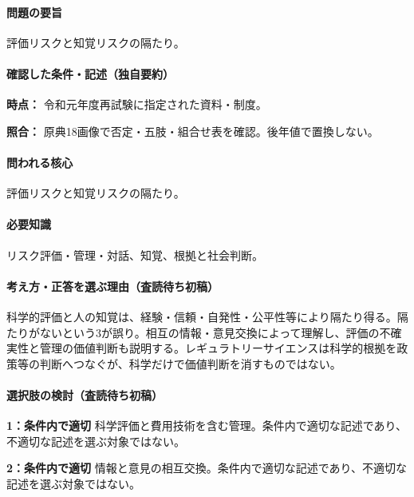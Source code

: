 \paragraph{問題の要旨} 評価リスクと知覚リスクの隔たり。

\paragraph{確認した条件・記述（独自要約）}\mbox{}\par

\noindent\textbf{時点：} 令和元年度再試験に指定された資料・制度。\par

\noindent\textbf{照合：} 原典18画像で否定・五肢・組合せ表を確認。後年値で置換しない。\par

\paragraph{問われる核心} 評価リスクと知覚リスクの隔たり。

\paragraph{必要知識} リスク評価・管理・対話、知覚、根拠と社会判断。

\paragraph{考え方・正答を選ぶ理由（査読待ち初稿）} 科学的評価と人の知覚は、経験・信頼・自発性・公平性等により隔たり得る。隔たりがないという3が誤り。相互の情報・意見交換によって理解し、評価の不確実性と管理の価値判断も説明する。レギュラトリーサイエンスは科学的根拠を政策等の判断へつなぐが、科学だけで価値判断を消すものではない。

\paragraph{選択肢の検討（査読待ち初稿）}\mbox{}\par

\noindent\textbf{1：条件内で適切} 科学評価と費用技術を含む管理。条件内で適切な記述であり、不適切な記述を選ぶ対象ではない。\par

\noindent\textbf{2：条件内で適切} 情報と意見の相互交換。条件内で適切な記述であり、不適切な記述を選ぶ対象ではない。\par

